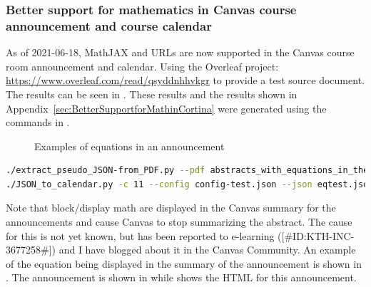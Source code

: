 \subsubsection{Better support for mathematics in Canvas course announcement and course calendar}
\label{sec:betterSupportMathInCortinaAndCourseCalendar}
As of 2021-06-18, MathJAX and URLs are now supported in the Canvas course room announcement and calendar.
Using the Overleaf project: \url{https://www.overleaf.com/read/qsyddnhhvkgr} to provide a test source document. The results can be seen in . These results and the results shown in Appendix~\ref{sec:BetterSupportforMathinCortina} were generated using the commands in .
\begin{figure}[!ht]
  \begin{center}
  \end{center}
  \caption{Examples of equations in an announcement}
  \label{fig:equationsInAnnouncement}
\end{figure}
\FloatBarrier
{}
\begin{lstlisting}[language={bash}, caption={Commands to produce the JSON and make the calendar entries and announcement}, label=lst:jsonToCalendar3]
./extract_pseudo_JSON-from_PDF.py --pdf abstracts_with_equations_in_them.pdf --json eqtest.json
./JSON_to_calendar.py -c 11 --config config-test.json --json eqtest.json
\end{lstlisting}

\FloatBarrier

Note that block/display math are displayed in the Canvas summary for the announcements and cause Canvas to stop summarizing the abstract. The cause for this is not yet known, but has been reported to e-learning ([\#ID:KTH-INC-3677258\#]) and I have blogged about it in the Canvas Community. An example of the equation being displayed in the summary of the announcement is shown in . The announcement is shown in  while  shows the HTML for this announcement.

